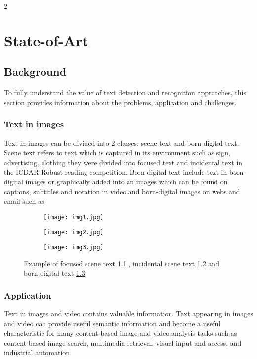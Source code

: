 
2\graphicspath{ {2chapterStateOfArt/image/} }
\chapter{State-of-Art} \label{State-of-Art}
\section{Background}

To fully understand the value of text detection and recognition approaches, this section provides information about the problems, application and challenges.
\subsection{Text in images}
Text in images can be divided into 2 classes: scene text and  born-digital text. Scene text refers to text which is captured in its environment such as sign, advertising, clothing they were divided into focused text and incidental text in the ICDAR Robust reading competition. Born-digital text include text in born-digital images or graphically added into an images which can be found on captions, subtitles and notation in video and born-digital images on webs and email \cite{Karatzas.2011.ICDAR} such as.


\begin{figure}

	\begin{subfigure}[b]{0.3\textwidth}
	 	\texttt{[image: img1.jpg]} \caption{}\label{fig:focused} \end{subfigure}
	\begin{subfigure}[b]{0.3\textwidth}
		\texttt{[image: img2.jpg]} \caption{}\label{fig:incidental} \end{subfigure}
	\begin{subfigure}[b]{0.3\textwidth}
		\texttt{[image: img3.jpg]} \caption{}\label{fig:bornDigital} \end{subfigure}
	\centering
	\caption[Example of \textit{text}] {Example of focused scene text \ref{fig:focused} , incidental scene text \ref{fig:incidental} and born-digital text \ref{fig:bornDigital} }
	\label{fig:example}
\end{figure}

\subsection{Application}
\par
Text in images and video contains valuable information. Text appearing in images and video can provide useful semantic information and become a useful characteristic for many content-based image and video analysis tasks such as content-based image search, multimedia retrieval, visual input and access, and industrial automation.

